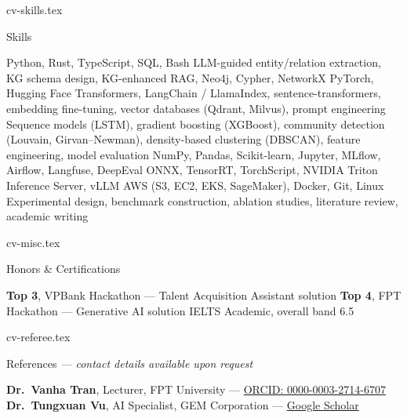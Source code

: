 \begin{filecontents*}[overwrite]{cv-skills.tex}
\begin{rubric}{Skills}

\entry*[Programming] Python, Rust, TypeScript, SQL, Bash
\entry*[KG] LLM-guided entity/relation extraction, KG schema design, KG-enhanced RAG, Neo4j, Cypher, NetworkX
 PyTorch, Hugging Face Transformers, LangChain / LlamaIndex, sentence-transformers, embedding fine-tuning, vector databases (Qdrant, Milvus), prompt engineering
\entry*[ML Methods] Sequence models (LSTM), gradient boosting (XGBoost), community detection (Louvain, Girvan--Newman), density-based clustering (DBSCAN), feature engineering, model evaluation
 NumPy, Pandas, Scikit-learn, Jupyter, MLflow, Airflow, Langfuse, DeepEval
 ONNX, TensorRT, TorchScript, NVIDIA Triton Inference Server, vLLM
 AWS (S3, EC2, EKS, SageMaker), Docker, Git, Linux
\entry*[Research] Experimental design, benchmark construction, ablation studies, literature review, academic writing

\end{rubric}
\end{filecontents*}

\begin{filecontents*}[overwrite]{cv-misc.tex}
\begin{rubric}{Honors \& Certifications}

\entry*[2024] \textbf{Top 3}, VPBank Hackathon --- Talent Acquisition Assistant solution
\entry*[2024] \textbf{Top 4}, FPT Hackathon --- Generative AI solution
\entry*[2024] IELTS Academic, overall band 6.5

\end{rubric}
\end{filecontents*}

\begin{filecontents*}[overwrite]{cv-referee.tex}
\begin{rubric}{References {\normalsize\mdseries\itshape\color{KeyColour}--- contact details available upon request}}

 \textbf{Dr.\ Vanha Tran}, Lecturer, FPT University --- \href{https://orcid.org/0000-0003-2714-6707}{ORCID: 0000-0003-2714-6707}
 \textbf{Dr.\ Tungxuan Vu}, AI Specialist, GEM Corporation --- \href{https://scholar.google.com/citations?user=IMNcTe_tJT8C}{Google Scholar}

\end{rubric}
\end{filecontents*}


